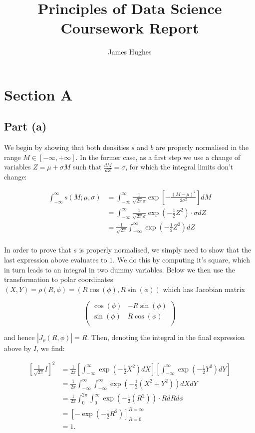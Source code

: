 \documentclass[12pt]{article}
\title{Principles of Data Science Coursework Report}
\author{James Hughes}
\begin{document}
\maketitle
\newpage


\section*{Section A}

\subsection*{Part (a)}

We begin by showing that both densities $s$ and $b$ are properly normalised in the range $M\in [-\infty, +\infty]$. In the former case, as a first step we use a change of variables $Z = \mu + \sigma M$ such that $\frac{dM}{dZ} = \sigma$, for which the integral limits don't change:

\begin{align*}
    \int_{-\infty}^\infty s(M;\mu, \sigma) & = \int_{-\infty}^\infty \frac{1}{\sqrt{2\pi}\sigma}\exp \left[-\frac{(M-\mu)^2}{2\sigma^2}\right]dM\\
        & = \int_{-\infty}^\infty \frac{1}{\sqrt{2\pi}\sigma}\exp(-\frac{1}{2}Z^2)\cdot \sigma dZ\\
        & = \frac{1}{\sqrt{2\pi}}\int_{-\infty}^\infty\exp(-\frac{1}{2}Z^2)dZ\\
\end{align*}

In order to prove that $s$ is properly normalised, we simply need to show that the last expression above evaluates to $1$. We do this by computing it's square, which in turn leads to an integral in two dummy variables. Below we then use the transformation to polar coordinates $(X,Y) = \rho(R,\phi) = (R\cos(\phi), R\sin(\phi))$ which has Jacobian matrix

\[
    \begin{pmatrix}
        \cos(\phi) & -R\sin(\phi) \\
        \sin(\phi) & R\cos(\phi) \\
    \end{pmatrix}
\]

and hence $|J_\rho(R,\phi)| = R$. Then, denoting the integral in the final expression above by $I$, we find:

\begin{align*}
    \left[\frac{1}{\sqrt{2\pi}}I\right]^2 & = \frac{1}{2\pi}\left[\int_{-\infty}^\infty\exp(-\frac{1}{2}X^2)dX\right]\left[\int_{-\infty}^\infty\exp(-\frac{1}{2}Y^2)dY\right] \\
        & = \frac{1}{2\pi}\int_{-\infty}^\infty\int_{-\infty}^\infty\exp(-\frac{1}{2}(X^2 + Y^2))dXdY\\
        & = \frac{1}{2\pi}\int_{0}^{2\pi}\int_{0}^\infty\exp(-\frac{1}{2}(R^2))\cdot R dRd\phi\\
        & = \left[-\exp(-\frac{1}{2}R^2)\right]_{R=0}^{R=\infty} \\
        & = 1. \\
\end{align*}
\end{document}
